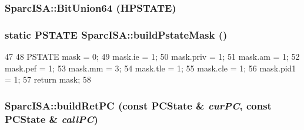 \label{namespaceSparcISA_a36fc5916dec11c97ac8e2c55a2faec03}
\hypertarget{namespaceSparcISA_abe81ef90e3604c575f470d6bd37d031b}{
\subsubsection[{BitUnion64}]{\setlength{\rightskip}{0pt plus 5cm}SparcISA::BitUnion64 (HPSTATE)}}
\label{namespaceSparcISA_abe81ef90e3604c575f470d6bd37d031b}
\hypertarget{namespaceSparcISA_a0170de35fad2e40ebe06650f8b074bdc}{
\subsubsection[{buildPstateMask}]{\setlength{\rightskip}{0pt plus 5cm}static PSTATE SparcISA::buildPstateMask ()}}
\label{namespaceSparcISA_a0170de35fad2e40ebe06650f8b074bdc}



\begin{DoxyCode}
47 {
48     PSTATE mask = 0;
49     mask.ie = 1;
50     mask.priv = 1;
51     mask.am = 1;
52     mask.pef = 1;
53     mask.mm = 3;
54     mask.tle = 1;
55     mask.cle = 1;
56     mask.pid1 = 1;
57     return mask;
58 }
\end{DoxyCode}
\hypertarget{namespaceSparcISA_a78daadca16f296fa73d02e493f19ba4a}{
\subsubsection[{buildRetPC}]{ SparcISA::buildRetPC (const PCState \& {\em curPC}, \/  const PCState \& {\em callPC})}}
\label{namespaceSparcISA_a78daadca16f296fa73d02e493f19ba4a}



